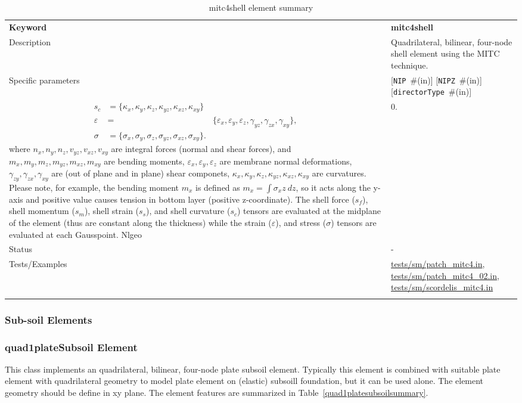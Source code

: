 \documentclass[a4paper]{article}
\newcommand{\param}[1]{\texttt{#1}} %
\newcommand{\optional}[1]{[#1]} %
\newcommand{\field}[2]{\param{#1}~\#{\tiny(#2)}} %
\newcommand{\optField}[2]{\optional{\field{#1}{#2}}}
\newcommand{\templabel}{}%
\newcommand{\tempcaption}{}%
\newcounter{nelpar}
\newenvironment{elementsummary}[5]{%
  \gdef\tempcaption{#4}%
  \gdef\templabel{#5}%
  \setcounter{nelpar}{0}%
  \begin{center} %
    \begin{table}[!htb] %
      \begin{tabular}{|l|p{9cm}|}\hline %
        {\bf Keyword} & \bf{#1}\\ %
        {Description} & {#2}\\ %
        {Specific parameters} & {#3}\\ \hline %
}{
  \\ \hline %
      \end{tabular}%
      \caption{\tempcaption}%
      \label{\templabel}%
    \end{table}%
  \end{center}%
}
\newcommand{\elementDescription}[2]{{#1} & {#2}\\}
\begin{document}
\begin{elementsummary}{mitc4shell}{Quadrilateral, bilinear, four-node shell element using the MITC technique.}{\optField{NIP}{in} \optField{NIPZ}{in} \optField{directorType}{in}}{mitc4shell element summary}{mitc4shellsummary}
{\begin{align*}
s_c &= \{\kappa_x, \kappa_y, \kappa_z, \kappa_{yz}, \kappa_{xz}, \kappa_{xy}\}\\
\varepsilon&=&\{\varepsilon_x, \varepsilon_y, \varepsilon_z, \gamma_{yz}, \gamma_{zx}, \gamma_{xy}\},\\
\sigma &= \{\sigma_x, \sigma_y, \sigma_z, \sigma_{yz}, \sigma_{xz}, \sigma_{xy}\}.
\end{align*}
where $n_x, n_y, n_z, v_{yz}, v_{xz}, v_{xy}$ are integral forces (normal and shear forces), and $m_x, m_y, m_z, m_{yz}, m_{xz}, m_{xy}$ are bending moments, $\varepsilon_x, \varepsilon_y, \varepsilon_z$ are membrane normal deformations, $\gamma_{zy}, \gamma_{zx}, \gamma_{xy}$ are (out of plane and in plane) shear componets, $\kappa_x, \kappa_y, \kappa_z, \kappa_{yz}, \kappa_{xz}, \kappa_{xy}$ are curvatures.  
Please note, for example, the bending moment $m_x$ is defined as $m_x=\int \sigma_x z\ dz$, so it acts along the y-axis and positive value causes tension in bottom layer (positive z-coordinate).
The shell force ($s_f$), shell momentum ($s_m$), shell strain ($s_s$), and shell curvature ($s_c$) tensors are evaluated at the midplane of the element (thus are constant along the thickness) while the strain ($\varepsilon$), and stress ($\sigma$) tensors are evaluated at each Gausspoint.
}
\elementDescription{Nlgeo}{0.}
\elementDescription{Status}{-}
\elementDescription{Tests/Examples}{\href{https://github.com/oofem/oofem/blob/devel/tests/sm/patch\_mitc4.in}{tests/sm/patch\_mitc4.in},
  \href{https://github.com/oofem/oofem/blob/devel/tests/sm/patch\_mitc4\_02.in}{tests/sm/patch\_mitc4\_02.in},
  \href{https://github.com/oofem/oofem/blob/devel/tests/sm/scordelis\_mitc4.in}{tests/sm/scordelis\_mitc4.in}
}
\end{elementsummary}


\subsubsection{Sub-soil Elements}
\subsubsection{quad1plateSubsoil Element} \label{quad1platesubsoil}
This class implements an quadrilateral, bilinear, four-node plate subsoil element.
Typically this element is combined with suitable plate element with quadrilateral geometry to model plate element on 
(elastic) subsoill foundation, but it can be used alone. The element geometry should be define in xy plane.
The element features are summarized in Table~\ref{quad1platesubsoilsummary}.
\end{document}
